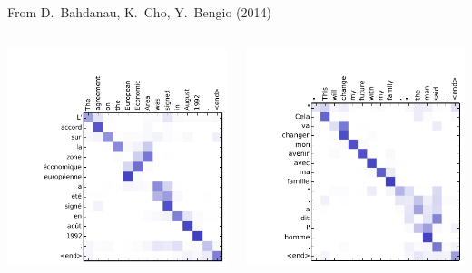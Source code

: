 \documentclass[aspectratio=169]{beamer}
\begin{document}
\begin{frame}{From D.\ Bahdanau, K.\ Cho, Y.\ Bengio (2014)}
\Large
\vspace{-0.5 cm}
\begin{columns}
\hspace{-0.75 cm}\includegraphics[width=\linewidth]{real-cross-attention-a.pdf}

\hspace{-1 cm}\includegraphics[width=\linewidth]{real-cross-attention-d.pdf}
\end{columns}
\end{frame}
\end{document}
